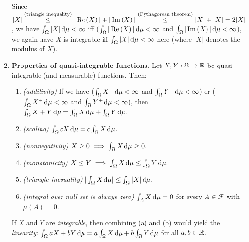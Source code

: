 \begin{enumerate}
\begin{remark}
Since \(|X|\overset{\text{(triangle inequality)}}{\le}|\operatorname{Re}\left(X\right)|+|\operatorname{Im}\left(X\right)|
\overset{\text{(Pythagorean theorem)}}{\le}|X|+|X|=2|X|\), we have
\(\int_{\Omega}^{}|X|\odif{\mu}<\infty\) iff (\(\int_{\Omega}^{}|\re{X}|\odif{\mu}<\infty\)
and \(\int_{\Omega}^{}|\im{X}|\odif{\mu}<\infty\)), we again have \(X\) is
integrable iff \(\int_{\Omega}^{}|X|\odif{\mu}<\infty\) here (where \(|X|\)
denotes the modulus of \(X\)).
\end{remark}
\item \label{it:quasi-int-prop}\textbf{Properties of quasi-integrable functions.} Let
\(X,Y:\Omega\to\bar{\mathbb{R}}\) be quasi-integrable (and measurable) functions. Then:
\begin{enumerate}
\item \emph{(additivity)} If we have (\(\int_{\Omega}^{}X^{-}\odif{\mu}<\infty\) and
\(\int_{\Omega}^{}Y^{-}\odif{\mu}<\infty\)) or
(\(\int_{\Omega}^{}X^{+}\odif{\mu}<\infty\) and
\(\int_{\Omega}^{}Y^{+}\odif{\mu}<\infty\)), then \(\int_{\Omega}^{}X+Y\odif{\mu}
=\int_{\Omega}^{}X\odif{\mu}+\int_{\Omega}^{}Y\odif{\mu}\).
\item \emph{(scaling)} \(\int_{\Omega}^{}cX\odif{\mu}=c\int_{\Omega}^{}X\odif{\mu}\).
\item \emph{(nonnegativity)} \(X\ge 0\implies \int_{\Omega}^{}X\odif{\mu}\ge 0\).
\item \emph{(monotonicity)} \(X\le Y\implies \int_{\Omega}^{}X\odif{\mu}\le\int_{\Omega}^{}Y\odif{\mu}\).
\item \emph{(triangle inequality)} \(|\int_{\Omega}^{}X\odif{\mu}|\le\int_{\Omega}^{}|X|\odif{\mu}\).
\item \emph{(integral over null set is always zero)}
\(\int_{A}^{}X\odif{\mu}=0\) for every \(A\in\mathcal{F}\) with \(\mu(A)=0\).
\end{enumerate}
\begin{note}
If \(X\) and \(Y\) are \emph{integrable}, then combining (a) and (b) would
yield the \emph{linearity}:
\(\int_{\Omega}^{}aX+bY\odif{\mu}=a\int_{\Omega}^{}X\odif{\mu}+b\int_{\Omega}^{}Y\odif{\mu}\)
for all \(a,b\in\mathbb{R}\).
\end{note}


\end{enumerate}
